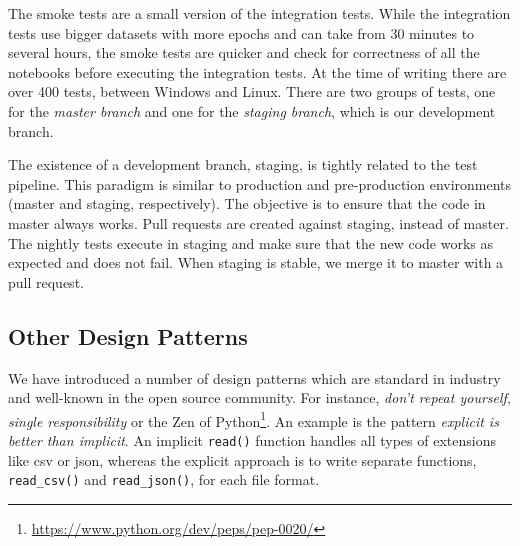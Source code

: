The smoke tests are a small version of the integration tests. While the integration tests
use bigger datasets with more epochs and can take from 30 minutes to several hours, the smoke tests are quicker and
check for correctness of all the notebooks before executing the integration tests.
At the time of writing there are over 400 tests, between Windows and Linux. There are two groups of tests,
one for the {\em master branch} and one for the {\em staging branch}, which is our development branch.

The existence of a development branch, staging, is tightly related to the test pipeline. This paradigm is similar to
production and pre-production environments (master and staging, respectively).
The objective is to ensure that the code in master always works. Pull requests are created 
against staging, instead of master. The nightly tests execute in staging and make sure that the new code 
works as expected and does not fail. When staging is stable, we merge it to master with a pull request.  


\subsection{Other Design Patterns}

We have introduced a number of design patterns which are standard in industry and well-known
in the open source community. For instance, \textit{don't repeat yourself}, \textit{single
responsibility} or the Zen of Python\footnote{\url{https://www.python.org/dev/peps/pep-0020/}}. 
An example is the pattern \textit{explicit is better than implicit}.
An implicit \verb!read()! function handles all types of extensions like csv or json,  
%
%
whereas the explicit approach is to write separate functions, \verb!read_csv()! and \verb!read_json()!, for each file format. 


